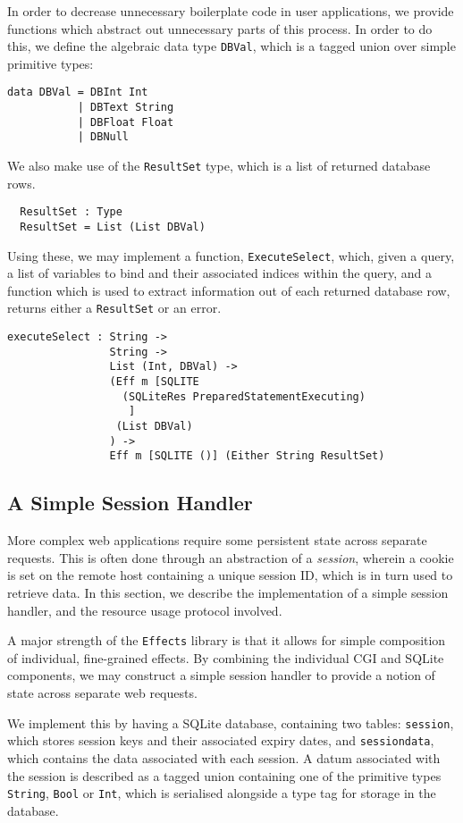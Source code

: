 \documentclass[preprint]{sigplanconf}
\begin{document}
In order to decrease unnecessary boilerplate code in user applications, we provide functions which abstract out unnecessary parts of this process. In order to do this, we define the algebraic data type \texttt{DBVal}, which is a tagged union over simple primitive types:
{\small
\begin{verbatim}
data DBVal = DBInt Int
           | DBText String
           | DBFloat Float
           | DBNull
\end{verbatim}
}
We also make use of the \texttt{ResultSet} type, which is a list of returned database rows.
{\small
\begin{verbatim}
  ResultSet : Type
  ResultSet = List (List DBVal)
\end{verbatim}
}
Using these, we may implement a function, \texttt{ExecuteSelect}, which, given a query, a list of variables to bind and their associated indices within the query, and a function which is used to extract information out of each returned database row, returns either a \texttt{ResultSet} or an error.
{\small
\begin{verbatim}
executeSelect : String ->
                String -> 
                List (Int, DBVal) -> 
                (Eff m [SQLITE 
                  (SQLiteRes PreparedStatementExecuting)
                   ] 
                 (List DBVal)
                ) -> 
                Eff m [SQLITE ()] (Either String ResultSet)
\end{verbatim}
}

\subsection{A Simple Session Handler}
More complex web applications require some persistent state across separate requests. This is often done through an abstraction of a \textit{session}, wherein a cookie is set on the remote host containing a unique session ID, which is in turn used to retrieve data. In this section, we describe the implementation of a simple session handler, and the resource usage protocol involved. 

A major strength of the \texttt{Effects} library is that it allows for simple composition of individual, fine-grained effects. By combining the individual CGI and SQLite components, we may construct a simple session handler to provide a notion of state across separate web requests. 

We implement this by having a SQLite database, containing two tables: \texttt{session}, which stores session keys and their associated expiry dates, and \texttt{sessiondata}, which contains the data associated with each session. A datum associated with the session is described as a tagged union containing one of the primitive types \texttt{String}, \texttt{Bool} or \texttt{Int}, which is serialised alongside a type tag for storage in the database.
\end{document}
